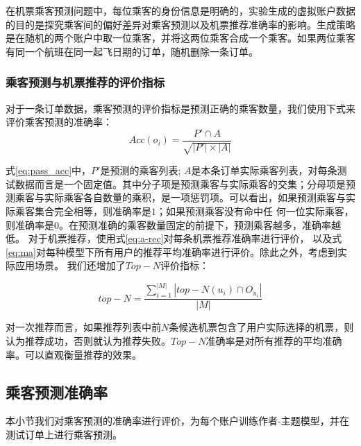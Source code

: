 在机票乘客预测问题中，每位乘客的身份信息是明确的，实验生成的虚拟账户数据的目的是探究乘客间的偏好差异对乘客预测以及机票推荐准确率的影响。生成策略是在随机的两个账户中取一位乘客，并将这两位乘客合成一个乘客。如果两位乘客有同一个航班在同一起飞日期的订单，随机删除一条订单。

\subsubsection{乘客预测与机票推荐的评价指标}

对于一条订单数据，乘客预测的评价指标是预测正确的乘客数量，我们使用下式来评价乘客预测的准确率：
\begin{equation}
\label{eq:pass_acc}
Acc(o_i) = \frac{P' \cap A}{\sqrt{|P'| \times |A|}}
\end{equation}

式\ref{eq:pass_acc}中，$P'$是预测的乘客列表; $A$是本条订单实际乘客列表，对每条测试数据而言是一个固定值。其中分子项是预测乘客与实际乘客的交集；分母项是预测乘客与实际乘客各自数量的乘积，是一项惩罚项。可以看出，如果预测乘客与实际乘客集合完全相等，则准确率是$1$；如果预测乘客没有命中任
何一位实际乘客，则准确率是$0$。在预测准确的乘客数量固定的前提下，预测乘客越多，准确率越低。
对于机票推荐，使用式\ref{eq:a-rec}对每条机票推荐准确率进行评价，
以及式\ref{eq:ma}对每种模型下所有用户的推荐平均准确率进行评价。除此之外，考虑到实际应用场景。
我们还增加了$Top-N$评价指标：

\begin{equation}
\label{eq:topn}
top-N = \frac{\sum_{i=1}^{|M|}|top-N(u_i) \cap O_{u_i}|}{|M|}
\end{equation}

对一次推荐而言，如果推荐列表中前$N$条候选机票包含了用户实际选择的机票，则认为推荐成功，否则就认为推荐失败。$Top-N$准确率是对所有推荐的平均准确率。可以直观衡量推荐的效果。


\subsection{乘客预测准确率}
本小节我们对乘客预测的准确率进行评价，为每个账户训练作者-主题模型，并在测试订单上进行乘客预测。
\begin{figure}[!h]
\centering
{}
\end{figure}

